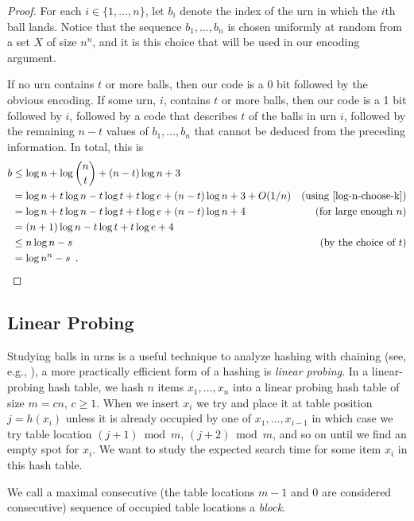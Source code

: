 \documentclass{patmorin}
\begin{document}
\begin{proof}
  For each $i\in\{1,\ldots,n\}$, let $b_i$ denote the index of the urn in
  which the $i$th ball lands. Notice that the sequence $b_1,\ldots,b_n$
  is chosen uniformly at random from a set $X$ of size $n^n$, and it is this
  choice that will be used in our encoding argument.

  If no urn contains $t$ or more balls, then our code is a 0 bit followed
  by the obvious encoding. If some urn, $i$, contains $t$ or more balls,
  then our code is a 1 bit followed by $i$, followed by a code that
  describes $t$ of the balls in urn $i$, followed by the remaining $n-t$
  values of $b_1,\ldots,b_n$ that cannot be deduced from the preceding
  information.  In total, this is
  \begin{align*}
    b &\le \log n + \log\binom{n}{t} 
           + (n-t)\log n + 3 \\
     & = \log n + t\log n - t\log t + t\log e  
           + (n-t)\log n + 3 + O(1/n)
             & \text{(using \eqref{log-n-choose-k})} \\
     & = \log n + t\log n - t\log t + t\log e  
           + (n-t)\log n + 4
             & \text{(for large enough $n$)} \\
     & = (n+1)\log n - t\log t + t\log e + 4 \\
     & \le  n\log n - s &\text{(by the choice of $t$)} \\
     & =  \log n^n - s \enspace . & \qedhere
  \end{align*}
\end{proof}

\subsection{Linear Probing}

Studying balls in urns is a useful technique to analyze hashing with
chaining (see, e.g., \cite[Section~5.1]{morin:open}), a more practically
efficient form of a hashing is \emph{linear probing}.  In a linear-probing
hash table, we hash $n$ items $x_1,\ldots,x_n$ into a linear probing hash
table of size $m=cn$, $c\ge 1$. When we insert $x_i$ we try and place
it at table position $j=h(x_i)$ unless it is already occupied by one of
$x_1,\ldots,x_{i-1}$ in which case we try table location $(j+1)\bmod m$,
$(j+2)\bmod m$, and so on until we find an empty spot for $x_i$.  We want
to study the expected search time for some item $x_i$ in this hash table.

We call a maximal consecutive (the table locations $m-1$ and
$0$ are considered consecutive) sequence of occupied table locations
a \emph{block}.
\end{document}
